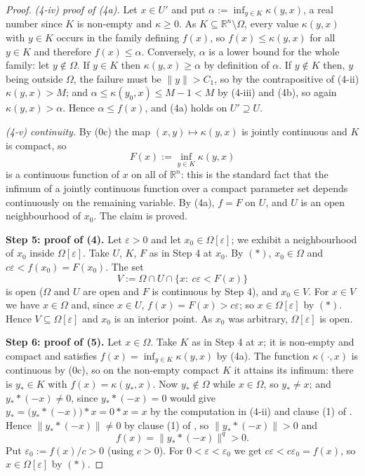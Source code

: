 \begin{proof}
\emph{(4-iv) proof of (4a).} Let $x\in U'$ and put $\alpha:=\inf_{y\in K}\kappa(y,x)$, a
real number since $K$ is non-empty and $\kappa\ge0$. As $K\subseteq\mathbb R^{n}\setminus\Omega$,
every value $\kappa(y,x)$ with $y\in K$ occurs in the family defining $f(x)$, so
$f(x)\le\kappa(y,x)$ for all $y\in K$ and therefore $f(x)\le\alpha$. Conversely, $\alpha$ is
a lower bound for the whole family: let $y\notin\Omega$. If $y\in K$ then
$\kappa(y,x)\ge\alpha$ by definition of $\alpha$. If $y\notin K$ then, $y$ being outside
$\Omega$, the failure must be $\|y\|>C_1$, so by the contrapositive of (4-ii)
$\kappa(y,x)>M$; and $\alpha\le\kappa(y_0,x)\le M-1<M$ by (4-iii) and (4b), so again
$\kappa(y,x)>\alpha$. Hence $\alpha\le f(x)$, and (4a) holds on $U'\supseteq U$.

\emph{(4-v) continuity.} By (0c) the map $(x,y)\mapsto\kappa(y,x)$ is jointly continuous and
$K$ is compact, so
\[
 F(x):=\inf_{y\in K}\kappa(y,x)
\]
is a continuous function of $x$ on all of $\mathbb R^{n}$: this is the standard fact that
the infimum of a jointly continuous function over a compact parameter set depends
continuously on the remaining variable. By (4a), $f=F$ on $U$, and $U$ is an open
neighbourhood of $x_0$. The claim is proved.

\medskip\noindent\textbf{Step 5: proof of (4).} Let $\varepsilon>0$ and let
$x_0\in\Omega[\varepsilon]$; we exhibit a neighbourhood of $x_0$ inside
$\Omega[\varepsilon]$. Take $U$, $K$, $F$ as in Step 4 at $x_0$. By $(\ast)$,
$x_0\in\Omega$ and $c\varepsilon<f(x_0)=F(x_0)$. The set
\[
 V:=\Omega\cap U\cap\{x:\ c\varepsilon<F(x)\}
\]
is open ($\Omega$ and $U$ are open and $F$ is continuous by Step 4), and $x_0\in V$. For
$x\in V$ we have $x\in\Omega$ and, since $x\in U$, $f(x)=F(x)>c\varepsilon$; so
$x\in\Omega[\varepsilon]$ by $(\ast)$. Hence $V\subseteq\Omega[\varepsilon]$ and $x_0$ is an
interior point. As $x_0$ was arbitrary, $\Omega[\varepsilon]$ is open.

\medskip\noindent\textbf{Step 6: proof of (5).} Let $x\in\Omega$. Take $K$ as in Step 4 at
$x$; it is non-empty and compact and satisfies $f(x)=\inf_{y\in K}\kappa(y,x)$ by (4a). The
function $\kappa(\cdot,x)$ is continuous by (0c), so on the non-empty compact $K$ it attains
its infimum: there is $y_\ast\in K$ with $f(x)=\kappa(y_\ast,x)$. Now $y_\ast\notin\Omega$
while $x\in\Omega$, so $y_\ast\ne x$; and $y_\ast*(-x)\ne0$, since
$y_\ast*(-x)=0$ would give $y_\ast=\big(y_\ast*(-x)\big)*x=0*x=x$ by the computation in
(4-ii) and clause (1) of . Hence $\|y_\ast*(-x)\|\ne0$ by clause (1)
of , so $\|y_\ast*(-x)\|>0$ and
\[
 f(x)=\|y_\ast*(-x)\|^{q}>0 .
\]
Put $\varepsilon_0:=f(x)/c>0$ (using $c>0$). For $0<\varepsilon<\varepsilon_0$ we get
$c\varepsilon<c\varepsilon_0=f(x)$, so $x\in\Omega[\varepsilon]$ by $(\ast)$.


\end{proof}
